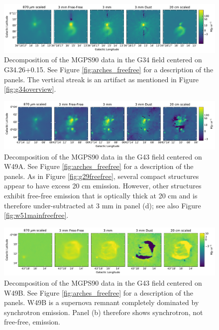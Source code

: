 \documentclass[twocolumn]{aastex62}
\begin{document}
\begin{figure}[htp]
    \includegraphics[width=17cm]{figures/G34_g34_5panel.pdf}
    \caption{Decomposition of the MGPS90 data in the G34 field centered on G34.26+0.15.
    See Figure \ref{fig:arches_freefree} for a description of the panels.
    The vertical streak is an artifact as mentioned in Figure \ref{fig:g34overview}.
}
\label{fig:g34freefree}
\end{figure}


\begin{figure}[htp]
    \includegraphics[width=17cm]{figures/G43_w49a_5panel.pdf}
    \caption{Decomposition of the MGPS90 data in the G43 field centered on W49A.
    See Figure \ref{fig:arches_freefree} for a description of the panels.
    As in Figure \ref{fig:g29freefree}, several compact structures appear to have
    excess 20 cm emission.  However, other structures exhibit free-free
    emission that is optically thick at 20 cm and is therefore under-subtracted
    at 3 mm in panel (d); see also Figure \ref{fig:w51mainfreefree}.
}
\label{fig:w49afreefree}
\end{figure}

\begin{figure}[htp]
    \includegraphics[width=17cm]{figures/G43_w49b_5panel.pdf}
    \caption{Decomposition of the MGPS90 data in the G43 field centered on W49B.
    See Figure \ref{fig:arches_freefree} for a description of the panels.
    W49B is a supernova remnant completely dominated by synchrotron emission.
    Panel (b) therefore shows synchrotron, not free-free, emission.
}
\label{fig:w49bfreefree}
\end{figure}
\end{document}

